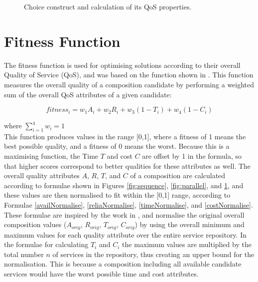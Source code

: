 \begin{figure}
\centerline{
}
\caption{Choice construct and calculation of its QoS properties.}
\label{fig:conditional}
\end{figure}

\section{Fitness Function}
The fitness function is used for optimising solutions according to their overall Quality of Service (QoS), and was based on the function shown in \cite{sawczuk2015gp}. This function measures the overall quality of a composition candidate by performing a weighted sum of the overall QoS attributes of a given candidate:

\begin{equation}
 fitness_i = w_1A_i + w_2R_i + w_3(1 - T_i) + w_4(1 - C_i)
\end{equation}

where $\sum_{i=1}^4{w_i} = 1$ \\

This function produces values in the range [0,1], where a fitness of 1 means the best possible quality, and a fitness of 0 means the worst. Because this is a maximising function, the Time $T$ and cost $C$ are offset by 1 in the formula, so that higher scores correspond to better qualities for these attributes as well. The overall quality attributes $A$, $R$, $T$, and $C$ of a composition are calculated according to formulae shown in Figures \ref{fig:sequence}, \ref{fig:parallel}, and \ref{fig:conditional}, and these values are then normalised to fit within the [0,1] range, according to Formulae \ref{availNormalise}, \ref{reliaNormalise}, \ref{timeNormalise}, and \ref{costNormalise}. These formulae are inspired by the work in \cite{ma2015hybrid}, and normalise the original overall composition values ($A_{orig}$, $R_{orig}$, $T_{orig}$, $C_{orig}$) by using the overall minimum and maximum values for each quality attribute over the entire service repository. In the formulae for calculating $T_i$ and $C_i$ the maximum values are multiplied by the total number $n$ of services in the repository, thus creating an upper bound for the normalisation. This is because a composition including all available candidate services would have the worst possible time and cost attributes.

